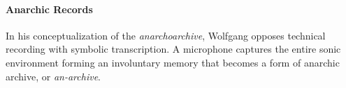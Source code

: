 




\paragraph{Anarchic Records}
In his conceptualization of the \textit{anarchoarchive}, Wolfgang \textcite{Ern13:Dig} opposes technical recording with symbolic transcription. A microphone captures the entire sonic environment forming an involuntary memory that becomes a form of anarchic archive, or \textit{an-archive}. 
% 

